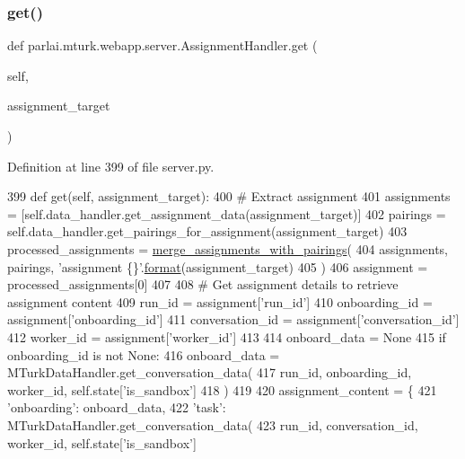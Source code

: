 \subsubsection{\texorpdfstring{get()}{get()}}
{\footnotesize\ttfamily def parlai.\+mturk.\+webapp.\+server.\+Assignment\+Handler.\+get (\begin{DoxyParamCaption}\item[{}]{self,  }\item[{}]{assignment\+\_\+target }\end{DoxyParamCaption})}



Definition at line 399 of file server.\+py.


\begin{DoxyCode}
399     \textcolor{keyword}{def }get(self, assignment\_target):
400         \textcolor{comment}{# Extract assignment}
401         assignments = [self.data\_handler.get\_assignment\_data(assignment\_target)]
402         pairings = self.data\_handler.get\_pairings\_for\_assignment(assignment\_target)
403         processed\_assignments = \hyperlink{namespaceparlai_1_1mturk_1_1webapp_1_1server_abe6ddbf97d0e5c26315fa927ed076489}{merge\_assignments\_with\_pairings}(
404             assignments, pairings, \textcolor{stringliteral}{'assignment \{\}'}.\hyperlink{namespaceparlai_1_1chat__service_1_1services_1_1messenger_1_1shared__utils_a32e2e2022b824fbaf80c747160b52a76}{format}(assignment\_target)
405         )
406         assignment = processed\_assignments[0]
407 
408         \textcolor{comment}{# Get assignment details to retrieve assignment content}
409         run\_id = assignment[\textcolor{stringliteral}{'run\_id'}]
410         onboarding\_id = assignment[\textcolor{stringliteral}{'onboarding\_id'}]
411         conversation\_id = assignment[\textcolor{stringliteral}{'conversation\_id'}]
412         worker\_id = assignment[\textcolor{stringliteral}{'worker\_id'}]
413 
414         onboard\_data = \textcolor{keywordtype}{None}
415         \textcolor{keywordflow}{if} onboarding\_id \textcolor{keywordflow}{is} \textcolor{keywordflow}{not} \textcolor{keywordtype}{None}:
416             onboard\_data = MTurkDataHandler.get\_conversation\_data(
417                 run\_id, onboarding\_id, worker\_id, self.state[\textcolor{stringliteral}{'is\_sandbox'}]
418             )
419 
420         assignment\_content = \{
421             \textcolor{stringliteral}{'onboarding'}: onboard\_data,
422             \textcolor{stringliteral}{'task'}: MTurkDataHandler.get\_conversation\_data(
423                 run\_id, conversation\_id, worker\_id, self.state[\textcolor{stringliteral}{'is\_sandbox'}]

\end{DoxyCode}
